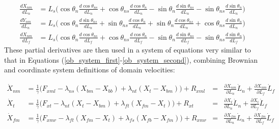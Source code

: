 \documentclass[
11pt, %
english, %
singlespacing, %
headsepline, %
chapterinoneline, %
]{MastersDoctoralThesis} %
\begin{document}
\begin{align}
  \frac{dX_{nm}}{dL_n} &= L_s\Big(\cos\theta_n\frac{d\cos\theta_{ns}}{dL_n} + \cos\theta_{ns}\frac{d\cos\theta_{n}}{dL_n} - \sin\theta_n\frac{d\sin\theta_{ns}}{dL_n} - \sin\theta_{ns}\frac{d\sin\theta_{n}}{dL_n}\Big)\\
  \frac{dY_{nm}}{dL_n} &= L_s\Big(\cos\theta_n\frac{d\sin\theta_{ns}}{dL_n} + \sin\theta_{ns}\frac{d\cos\theta_{n}}{dL_n} + \sin\theta_n\frac{d\cos\theta_{ns}}{dL_n} + \cos\theta_{ns}\frac{d\sin\theta_{n}}{dL_n} \Big)\\
  \frac{dX_{nm}}{dL_f} &= L_s\Big(\cos\theta_n\frac{d\cos\theta_{ns}}{dL_f} + \cos\theta_{ns}\frac{d\cos\theta_{n}}{dL_f} - \sin\theta_n\frac{d\sin\theta_{ns}}{dL_f} - \sin\theta_{ns}\frac{d\sin\theta_{n}}{dL_f} \Big)
\end{align}
%
These partial derivatives are then used in a system of equations very similar to that in Equations (\ref{ob_system_first}-\ref{ob_system_second}), combining Brownian and coordinate system definitions of domain velocities:

\begin{align}
  \dot{X}_{nm} &= \frac{1}{\gamma} \Big(F_{xml} - \lambda_{ns}(X_{bm} - X_{bb})
  + \lambda_{nt}(X_{t } - X_{bm}) \Big) + R_{xml}
  &=& \frac{\partial X_{nm}}{\partial L_n}\dot{L}_n + \frac{\partial X_{nm}}{\partial L_f}\dot{L}_f\\
  \dot{X}_{t } &= \frac{1}{\gamma} \Big(F_{xt } - \lambda_{nt}(X_{t } - X_{bm})
  + \lambda_{ft}(X_{fm} - X_{t }) \Big) + R_{xt }
  &=& \frac{\partial X_{t}}{\partial L_n}\dot{L}_n + \frac{\partial X_{t}}{\partial L_f}\dot{L}_f\\
  \dot{X}_{fm} &= \frac{1}{\gamma} \Big(F_{xmr} - \lambda_{ft}(X_{fm} - X_{t })
  + \lambda_{fs}(X_{fb} - X_{fm}) \Big) + R_{xmr}
  &=& \frac{\partial X_{fm}}{\partial L_n}\dot{L}_n + \frac{\partial X_{fm}}{\partial L_f}\dot{L}_f
\end{align}
\end{document}
